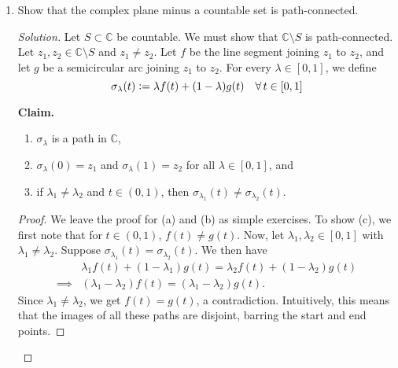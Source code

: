 \documentclass[11pt]{article}
\theoremstyle{definition}
\newenvironment{blockquote}
{\begin{mdframed}[skipabove=0pt, skipbelow=0pt, innertopmargin=4pt, innerbottommargin=4pt, bottomline=false,topline=false,rightline=false, linewidth=2pt]}
{\end{mdframed}}
\newenvironment{soln}{\begin{proof}[Solution]}{\end{proof}}
\begin{document}
\begin{enumerate}[leftmargin=*]
\begin{soln}
        Since $f(z_1, z_2)$ is non-constant at least one of $z_1$ or $z_2$ must ``appear'' in $f(z_1, z_2)$. Without loss of generality, suppose that $z_2$ appears in $f(z_1, z_2)$. We may write
        \[
            f(z_1, z_2) = \sum_{k=0}^n f_k(z_1) \cdot z_2^k
        \]
        where $n \geq 1$ and $f_k(z_1) \in \mathbb{C}[z_1]$. Moreover, $f_n \neq 0$, and thus, $f_n(z_1)$ has only finitely many roots (possibly zero). Thus, there are infinitely many $\alpha \in \mathbb{C}$ such that $f_n(\alpha) \neq 0$. Since, $n \geq 1$, we have that $f(\alpha, z_2) \in \mathbb{C}[z_2]$ is non-constant for all these infinitely many $\alpha$. By FTA, for each such $\alpha$, there exists $\beta \in \mathbb{C}$ such that $f(\alpha, \beta) = 0$. Thus, there are infinitely many roots of $f(z_1, z_2)$ in $\mathbb{C}^2$ (since it contains all these pairs $(\alpha, \beta)$ as $\alpha$ takes on infinitely many values). \qedhere
    \end{soln}
    
    \item Show that the complex plane minus a countable set is path-connected.
    
    \begin{soln}
        Let $S \subset \mathbb{C}$ be countable. We must show that $\mathbb{C} \setminus S$ is path-connected. Let $z_1, z_2 \in \mathbb{C} \setminus S$ and $z_1 \neq z_2$. Let $f$ be the line segment joining $z_1$ to $z_2$, and let $g$ be a semicircular arc joining $z_1$ to $z_2$. For every $\lambda \in [0,1]$, we define
        \[
            \sigma_{\lambda}(t) \vcentcolon= \lambda f(t) + (1-\lambda)g(t) \quad \forall \, t \in [0,1]
        \]
        
        \begin{blockquote}
			\textbf{Claim.} \begin{enumerate}
			    \item $\sigma_{\lambda}$ is a path in $\mathbb{C}$,
			    \item $\sigma_{\lambda}(0) = z_1$ and $\sigma_{\lambda}(1) = z_2$ for all $\lambda \in [0,1]$, and
			    \item if $\lambda_1 \neq \lambda_2$ and $t \in (0,1)$, then $\sigma_{\lambda_1}(t) \neq \sigma_{\lambda_2}(t)$.
			\end{enumerate} 
			\begin{proof} 
				We leave the proof for (a) and (b) as simple exercises. To show (c), we first note that for $t \in (0,1)$, $f(t) \neq g(t)$. Now, let $\lambda_1, \lambda_2 \in [0,1]$ with $\lambda_1 \neq \lambda_2$. Suppose $\sigma_{\lambda_1}(t) = \sigma_{\lambda_2}(t)$. We then have
				\begin{align*}
				    &\lambda_1 f(t) + (1-\lambda_1) g(t) = \lambda_2 f(t) + (1-\lambda_2) g(t) \\ \implies &(\lambda_1 - \lambda_2) f(t) = (\lambda_1 - \lambda_2) g(t).
				\end{align*}
				Since $\lambda_1 \neq \lambda_2$, we get $f(t) = g(t)$, a contradiction. Intuitively, this means that the images of all these paths are disjoint, barring the start and end points. 
			\end{proof}


\end{blockquote}
\end{soln}
\end{enumerate}
\end{document}
